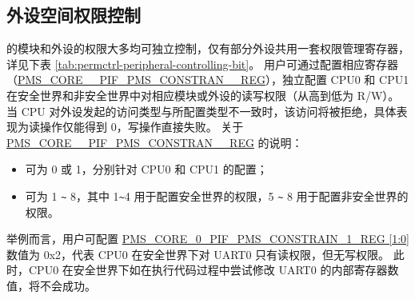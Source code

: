 \documentclass[main\_\_CN.tex]{subfiles}
\begin{document}
\subsection{外设空间权限控制}\label{sec:permctrl-peri-address}

\chipname{} 的模块和外设的权限大多均可独立控制，仅有部分外设共用一套权限管理寄存器，详见下表 \ref{tab:permctrl-peripheral-controlling-bit}。
用户可通过配置相应寄存器（\hyperref[regdesc:PMSCORE0PIFPMSCONSTRAIN1REG]{PMS\_CORE\_\_PIF\_PMS\_CONSTRAN\_\_REG}），独立配置 CPU0 和 CPU1 在安全世界和非安全世界中对相应模块或外设的读写权限（从高到低为 R/W）。当 CPU 对外设发起的访问类型与所配置类型不一致时，该访问将被拒绝，具体表现为读操作仅能得到 0，写操作直接失败。
关于 \hyperref[regdesc:PMSCORE0PIFPMSCONSTRAIN1REG]{PMS\_CORE\_\_PIF\_PMS\_CONSTRAN\_\_REG} 的说明：
\begin{itemize}
    \item {} 可为 0 或 1，分别针对 CPU0 和 CPU1 的配置；
    \item {} 可为 1 \verb+~+ 8，其中 1\verb+~+4 用于配置安全世界的权限，5 \verb+~+ 8 用于配置非安全世界的权限。
\end{itemize}

举例而言，用户可配置 \hyperref[regdesc:PMSCORE0PIFPMSCONSTRAIN1REG]{PMS\_CORE\_0\_PIF\_PMS\_CONSTRAIN\_1\_REG [1:0]} 数值为 0x{}2，代表 CPU0 在安全世界下对 UART0 只有读权限，但无写权限。
此时，CPU0 在安全世界下如在执行代码过程中尝试修改 UART0 的内部寄存器数值，将不会成功。
\end{document}
